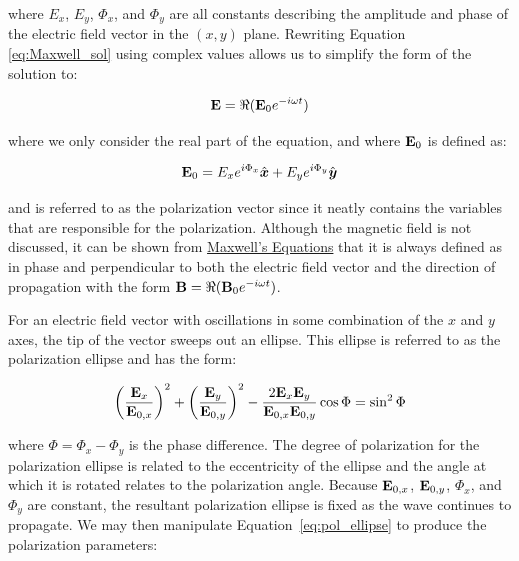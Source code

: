 \noindent where $E_{x}$, $E_{y}$, $\Phi_{x}$, and $\Phi_{y}$ are all constants describing the amplitude and phase of the electric field vector in the $(x, y)$ plane. Rewriting Equation \ref{eq:Maxwell_sol} using complex values allows us to simplify the form of the solution to:

\begin{equation}
    \mathbf{E} = \Re(\mathbf{E}_{0} e^{-i \omega t})
    \label{eq:E_field_vector}
\end{equation}

\noindent where we only consider the real part of the equation, and where $\mathbf{E}_{0}$ is defined as:

\begin{equation}
    \mathbf{E}_{0} = E_{x} e^{i \Phi_{x}} \hat{\boldsymbol{x}} + 
                     E_{y} e^{i \Phi_{y}} \hat{\boldsymbol{y}}
    \label{eq:pol_vector}
\end{equation}

\noindent and is referred to as the polarization vector since it neatly contains the variables that are responsible for the polarization. Although the magnetic field is not discussed, it can be shown from \hyperref[eq:Maxwell]{Maxwell's Equations} that it is always defined as in phase and perpendicular to both the electric field vector and the direction of propagation with the form $\mathbf{B} = \Re(\mathbf{B}_{0} e^{-i \omega t})$.
\prgph

For an electric field vector with oscillations in some combination of the $x$ and $y$ axes, the tip of the vector sweeps out an ellipse. This ellipse is referred to as the polarization ellipse and has the form:

\begin{equation}
    \left( \frac{\mathbf{E}_{x}}{\mathbf{E}_{0, x}}\right)^{2} +
    \left( \frac{\mathbf{E}_{y}}{\mathbf{E}_{0, y}}\right)^{2} -
    \frac{2 \mathbf{E}_{x} \mathbf{E}_{y}}{\mathbf{E}_{0, x} \mathbf{E}_{0, y}} \cos\Phi =
    \sin^{2} \Phi
    \label{eq:pol_ellipse}
\end{equation}

\noindent where $\Phi = \Phi_{x} - \Phi_{y}$ is the phase difference. The degree of polarization for the polarization ellipse is related to the eccentricity of the ellipse and the angle at which it is rotated relates to the polarization angle. Because $\mathbf{E}_{0, x}$, $\mathbf{E}_{0, y}$, $\Phi_{x}$, and $\Phi_{y}$ are constant, the resultant polarization ellipse is fixed as the wave continues to propagate. We may then manipulate Equation~\ref{eq:pol_ellipse} to produce the polarization parameters:

